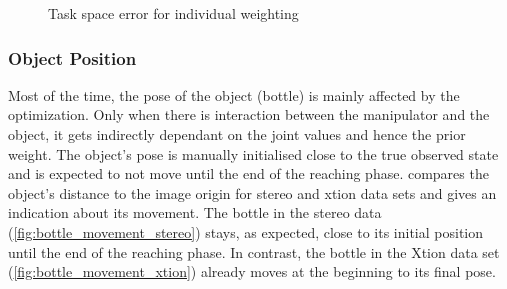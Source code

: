 \begin{figure}
\centering
{}
%

\caption{Task space error for individual weighting}
\label{fig:indiv_pose_error}
\end{figure}

\subsubsection{Object Position}

Most of the time, the pose of the object (bottle) is mainly affected by the optimization. Only when there is interaction between the manipulator and the object, it gets indirectly dependant on the joint values and hence the prior weight. The object's pose is manually initialised close to the true observed state and is expected to not move until the end of the reaching phase.  compares the object's distance to the image origin for stereo and xtion data sets and gives an indication about its movement. The bottle in the stereo data (\cref{fig:bottle_movement_stereo}) stays, as expected, close to its initial position until the end of the reaching phase. In contrast, the bottle in the Xtion data set (\cref{fig:bottle_movement_xtion}) already moves at the beginning to its final pose.


